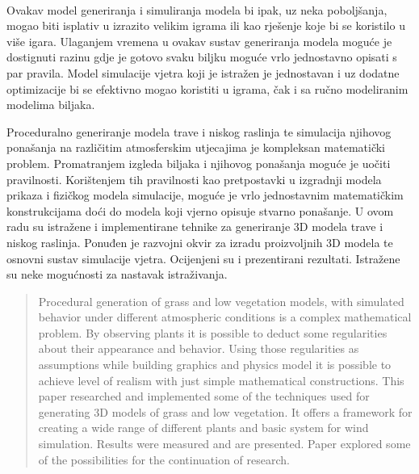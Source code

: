 \documentclass[times, utf8, diplomski]{fer}
\begin{document}
\paragraph{}
Ovakav model generiranja i simuliranja modela bi ipak, uz neka poboljšanja, mogao biti 
isplativ u izrazito velikim igrama ili kao rješenje koje bi se koristilo u više igara. 
Ulaganjem vremena u ovakav sustav generiranja modela moguće je dostignuti razinu gdje je 
gotovo svaku biljku moguće vrlo jednostavno opisati s par pravila. Model simulacije vjetra 
koji je istražen je jednostavan i uz dodatne optimizacije bi se efektivno mogao koristiti u 
igrama, čak i sa ručno modeliranim modelima biljaka.

\nocite{*}



\listoffigures
\lstlistoflistings
{}

\begin{sazetak}
Proceduralno generiranje modela trave i niskog raslinja te simulacija njihovog ponašanja na 
različitim atmosferskim utjecajima je kompleksan matematički problem. Promatranjem izgleda 
biljaka i njihovog ponašanja moguće je uočiti pravilnosti. Korištenjem tih pravilnosti kao 
pretpostavki u izgradnji modela prikaza i fizičkog modela simulacije, moguće je vrlo 
jednostavnim matematičkim konstrukcijama doći do modela koji vjerno opisuje stvarno 
ponašanje. U ovom radu su istražene i implementirane tehnike za generiranje 3D modela trave 
i niskog raslinja. Ponuđen je razvojni okvir za izradu proizvoljnih 3D modela te osnovni 
sustav simulacije vjetra. Ocijenjeni su i prezentirani rezultati. Istražene su neke 
mogućnosti za nastavak istraživanja.

\end{sazetak}

\begin{abstract}
Procedural generation of grass and low vegetation models, with simulated behavior under 
different atmospheric conditions is a complex mathematical problem. By observing plants it 
is possible to deduct some regularities about their appearance and behavior. Using those 
regularities as assumptions while building graphics and physics model it is possible to 
achieve level of realism with just simple mathematical constructions. This paper researched 
and implemented some of the techniques used for generating 3D models of grass and low 
vegetation. It offers a framework for creating a wide range of different plants and basic 
system for wind simulation. Results were measured and are presented. Paper explored some of the possibilities for the continuation of research.

\end{abstract}
\end{document}
